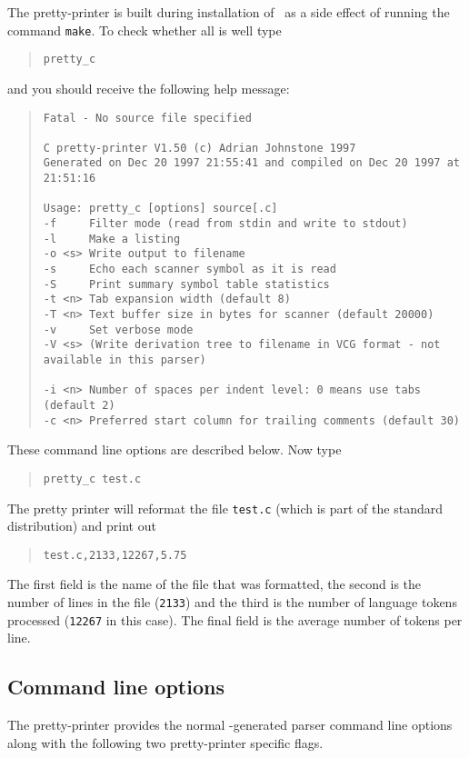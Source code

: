The pretty-printer is built during installation of \rdp\ as a side effect of running the
command {\tt make}. To check whether all is well type
\begin{quote}
\verb+pretty_c+
\end{quote}
and you should receive the following help message:
\begin{quote}
\footnotesize
\begin{verbatim}
Fatal - No source file specified

C pretty-printer V1.50 (c) Adrian Johnstone 1997
Generated on Dec 20 1997 21:55:41 and compiled on Dec 20 1997 at 21:51:16

Usage: pretty_c [options] source[.c]
-f     Filter mode (read from stdin and write to stdout)
-l     Make a listing
-o <s> Write output to filename
-s     Echo each scanner symbol as it is read
-S     Print summary symbol table statistics
-t <n> Tab expansion width (default 8)
-T <n> Text buffer size in bytes for scanner (default 20000)
-v     Set verbose mode
-V <s> (Write derivation tree to filename in VCG format - not available in this parser)

-i <n> Number of spaces per indent level: 0 means use tabs (default 2)
-c <n> Preferred start column for trailing comments (default 30)
\end{verbatim}
\end{quote}
These command line options are described below. Now type
\begin{quote}
\verb+pretty_c test.c+
\end{quote}
The pretty printer will reformat the file {\tt test.c} (which is part of the standard distribution)
and print out
\begin{quote}
\small
\begin{verbatim}
test.c,2133,12267,5.75
\end{verbatim}
\end{quote}
The first field is the name of the file that was formatted, the second is the number of
lines in the file ({\tt 2133}) and the third is the number of language tokens processed
({\tt 12267} in this case). The final field is the average number of tokens per line.


\subsection{Command line options}
The pretty-printer provides the normal \rdp-generated parser command line options along with
the following two pretty-printer specific flags.

